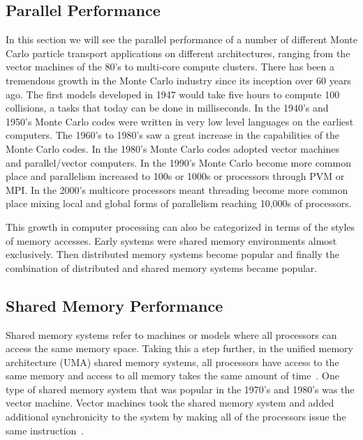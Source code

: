 \subsection{ \textbf{ Parallel Performance }}

In this section we will see the parallel performance of a number of different Monte Carlo particle transport applications on different architectures, ranging from the vector machines of the 80's to multi-core compute clusters.
%
There has been a tremendous growth in the Monte Carlo industry since its inception over 60 years ago.
%
The first models developed in 1947 would take five hours to compute 100 collisions, a tasks that today can be done in milliseconds.
%
In the 1940's and 1950's Monte Carlo codes were written in very low level languages on the earliest computers.
%
The 1960's to 1980's saw a great increase in the capabilities of the Monte Carlo codes.
%
In the 1980's Monte Carlo codes adopted vector machines and parallel/vector computers.
%
In the 1990's Monte Carlo become more common place and parallelism increased to 100s or 1000s or processors through PVM or MPI.
%
In the 2000's multicore processors meant threading become more common place mixing local and global forms of parallelism reaching 10,000s of processors.~\cite{brown2011recent}
%

This growth in computer processing can also be categorized in terms of the styles of memory accesses.
%
Early systems were shared memory environments almost exclusively.
%
Then distributed memory systems become popular and finally the combination of distributed and shared memory systems became popular.
%

\subsection*{ \textbf{Shared Memory Performance}} 

Shared memory systems refer to machines or models where all processors can access the same memory space.
%
Taking this a step further, in the unified memory architecture (UMA) shared memory systems, all processors have access to the same memory and access to all memory takes the same amount of time~\cite{el2005advanced}.
%
One type of shared memory system that was popular in the 1970's and 1980's was the vector machine.
%
Vector machines took the shared memory system and added additional synchronicity to the system by making all of the processors issue the same instruction~\cite{russell1978cray}.
%

